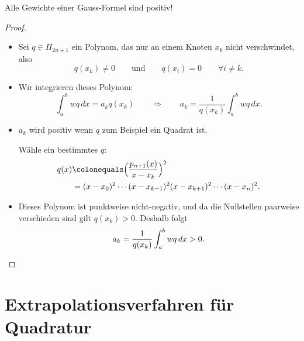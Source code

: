 \begin{satz}
Alle Gewichte einer Gauss-Formel sind positiv!
\end{satz}
\begin{proof}\mbox{}
\begin{itemize}
\item Sei $q \in \Pi_{2n+1}$ ein Polynom, das nur an einem Knoten $x_k$ nicht verschwindet, also
 \begin{equation*}
  q(x_k) \neq 0
  \qquad \text{und} \qquad
  q(x_i) = 0 \qquad \forall i \neq k.
 \end{equation*}

 \item Wir integrieren dieses Polynom:
  \begin{equation*}
   \int_a^b w q \,dx
   =
   a_k q(x_k)
   \qquad \Rightarrow \qquad
   a_k = \frac{1}{q(x_k)} \int_a^b wq \, dx.
  \end{equation*}

 \item $a_k$ wird positiv wenn $q$ zum Beispiel ein Quadrat ist.

  Wähle ein bestimmtes $q$:
  \begin{align*}
   q(x)
   & \colonequals
   \Big(\frac{p_{n+1}(x)}{x-x_k}\Big)^2 \\
   & =
   (x - x_0)^2 \cdots (x - x_{k-1})^2 (x - x_{k+1})^2 \cdots (x - x_n)^2.
  \end{align*}

 \item Dieses Polynom ist punktweise nicht-negativ, und da die Nullstellen paarweise
   verschieden sind gilt $q(x_k) > 0$.  Deshalb folgt
 \begin{equation*}
  a_k = \frac{1}{q(x_k)} \int_a^b wq \, dx
  > 0. \qedhere
 \end{equation*}
\end{itemize}
\end{proof}

\section{Extrapolationsverfahren für Quadratur}

